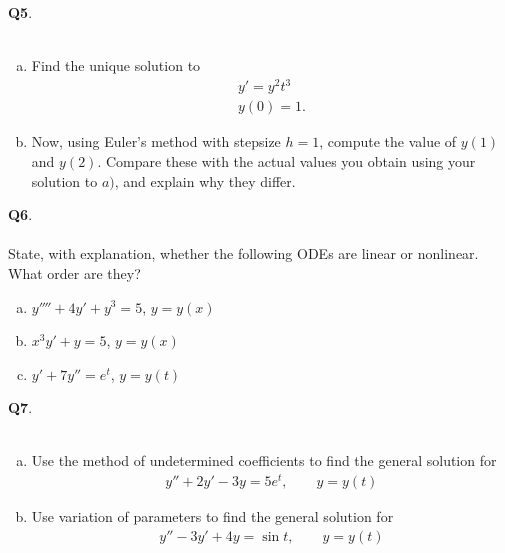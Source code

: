 \documentclass[12pt, oneside]{amsart}
\begin{document}
\noindent
\textbf{Q5}. \\ \\ 
\begin{enumerate}[a)]
	\item
Find the unique solution to
\begin{align*}
y' = y^2 t^3 \\
y(0)=1.
\end{align*}
\vspace{3in}
\item
Now, using Euler's method with stepsize $h = 1$, compute the value
of $y(1)$ and $y(2)$. Compare these
with the actual values you obtain using your
solution to $a)$, and explain why they differ.
\end{enumerate}
\newpage
\noindent
\textbf{Q6}. \\ \\ 
State, with explanation, whether the following ODEs are linear or nonlinear. What order are they?

\vspace{1in}
\begin{enumerate}[a)]
    \item
        $y'''' + 4y' + y^{3} = 5$, \quad $y = y(x)$
        \vspace{2in}

    \item
        $x^3y' + y = 5$, \quad $y = y(x)$
        \vspace{2in}

    \item 
        $y' + 7y'' = e^t$, \quad $y = y(t)$
        \vspace{2in}
\end{enumerate}
\newpage
\noindent
\textbf{Q7}. \\ \\ 
\begin{enumerate}[a)]
	\item
Use the method of undetermined coefficients to find the
general solution for
\begin{align*}
y'' + 2y' -3y = 5e^t, \qquad y = y(t)
\end{align*}
\vspace{3in}
\item

Use variation of parameters to find the general solution for
\begin{align*}
y'' -3y' + 4y = \sin t, \qquad y = y(t)
\end{align*}
\end{enumerate}
\end{document}
